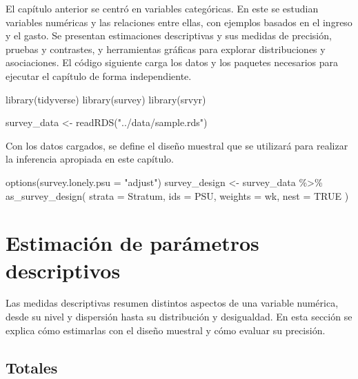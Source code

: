\documentclass[
  spanish,
  11pt,
  letterpaper,
  oneside,
  open=any]{scrbook}
\newenvironment{Shaded}{\begin{snugshade}}{\end{snugshade}}
\newcommand{\AttributeTok}[1]{\textcolor[rgb]{0.40,0.45,0.13}{#1}}
\newcommand{\ConstantTok}[1]{\textcolor[rgb]{0.56,0.35,0.01}{#1}}
\newcommand{\FunctionTok}[1]{\textcolor[rgb]{0.28,0.35,0.67}{#1}}
\newcommand{\NormalTok}[1]{\textcolor[rgb]{0.00,0.23,0.31}{#1}}
\newcommand{\OtherTok}[1]{\textcolor[rgb]{0.00,0.23,0.31}{#1}}
\newcommand{\SpecialCharTok}[1]{\textcolor[rgb]{0.37,0.37,0.37}{#1}}
\newcommand{\StringTok}[1]{\textcolor[rgb]{0.13,0.47,0.30}{#1}}
\begin{document}
El capítulo anterior se centró en variables categóricas. En este se
estudian variables numéricas y las relaciones entre ellas, con ejemplos
basados en el ingreso y el gasto. Se presentan estimaciones descriptivas
y sus medidas de precisión, pruebas y contrastes, y herramientas
gráficas para explorar distribuciones y asociaciones. El código
siguiente carga los datos y los paquetes necesarios para ejecutar el
capítulo de forma independiente.

\begin{Shaded}
\begin{Highlighting}[]
\FunctionTok{library}\NormalTok{(tidyverse)}
\FunctionTok{library}\NormalTok{(survey)}
\FunctionTok{library}\NormalTok{(srvyr)}

\NormalTok{survey\_data }\OtherTok{\textless{}{-}} \FunctionTok{readRDS}\NormalTok{(}\StringTok{"../data/sample.rds"}\NormalTok{)}
\end{Highlighting}
\end{Shaded}

Con los datos cargados, se define el diseño muestral que se utilizará
para realizar la inferencia apropiada en este capítulo.

\begin{Shaded}
\begin{Highlighting}[]
\FunctionTok{options}\NormalTok{(}\AttributeTok{survey.lonely.psu =} \StringTok{"adjust"}\NormalTok{)}
\NormalTok{survey\_design }\OtherTok{\textless{}{-}}\NormalTok{ survey\_data }\SpecialCharTok{\%\textgreater{}\%}
  \FunctionTok{as\_survey\_design}\NormalTok{(}
    \AttributeTok{strata =}\NormalTok{ Stratum,}
    \AttributeTok{ids =}\NormalTok{ PSU,}
    \AttributeTok{weights =}\NormalTok{ wk,}
    \AttributeTok{nest =} \ConstantTok{TRUE}
\NormalTok{  )}
\end{Highlighting}
\end{Shaded}

\section{Estimación de parámetros
descriptivos}\label{estimacion-de-parametros-descriptivos}

Las medidas descriptivas resumen distintos aspectos de una variable
numérica, desde su nivel y dispersión hasta su distribución y
desigualdad. En esta sección se explica cómo estimarlas con el diseño
muestral y cómo evaluar su precisión.

\subsection{Totales}\label{estimacion-del-total}
\end{document}

